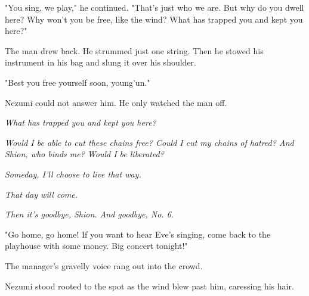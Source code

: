 "You sing, we play," he continued. "That's just who we are. But why do
you dwell here? Why won't you be free, like the wind?
What has trapped you and kept you here?"

The man drew back. He strummed just one string. Then he
stowed his instrument in his bag and slung it over his shoulder.

"Best you free yourself soon, young'un."

Nezumi could not answer him. He only watched the man off.

\emph{What has trapped you and kept you here?}

\emph{Would I be able to cut these chains free? Could I cut my chains of
hatred? And Shion, who binds me? Would I be liberated?}

\emph{Someday, I'll choose to live that way.}

\emph{That day will come.}

\emph{Then it's goodbye, Shion. And goodbye, No. 6.}

"Go home, go home! If you want to hear Eve's singing, come back to the
playhouse with some money. Big concert tonight!"

The manager's gravelly voice rang out into the crowd.

Nezumi stood rooted to the spot as the wind blew past him, caressing his
hair.